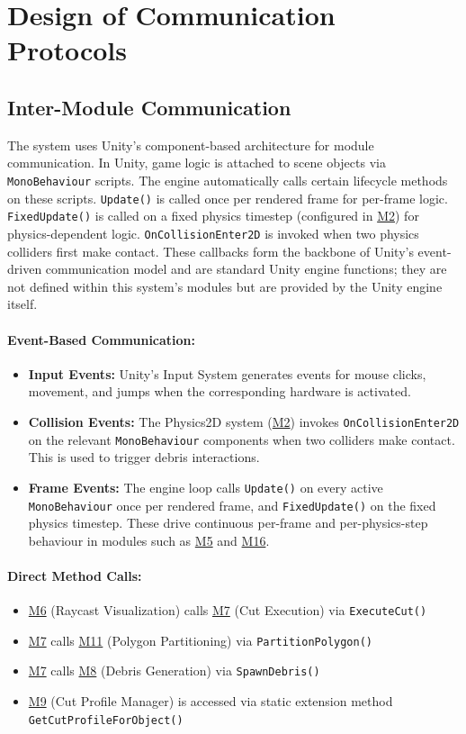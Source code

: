 \documentclass[12pt, titlepage]{article}
\begin{document}
\section{Design of Communication Protocols}\label{SecDCP}

\subsection{Inter-Module Communication}

The system uses Unity's component-based architecture for module communication.
In Unity, game logic is attached to scene objects via \texttt{MonoBehaviour} scripts.
The engine automatically calls certain lifecycle methods on these scripts.
\texttt{Update()} is called once per rendered frame for per-frame logic.
\texttt{FixedUpdate()} is called on a fixed physics timestep (configured in \hyperref[M2]{M2})
for physics-dependent logic. \texttt{OnCollisionEnter2D} is invoked when two
physics colliders first make contact. These callbacks form the backbone of Unity's
event-driven communication model and are standard Unity engine functions; they are
not defined within this system's modules but are provided by the Unity engine itself.

\paragraph{Event-Based Communication:}
\begin{itemize}
\item \textbf{Input Events:} Unity's Input System generates events for mouse clicks, movement, and jumps when the corresponding hardware is activated.
\item \textbf{Collision Events:} The Physics2D system (\hyperref[M2]{M2}) invokes \texttt{OnCollisionEnter2D} on the relevant \texttt{MonoBehaviour} components when two colliders make contact. This is used to trigger debris interactions.
\item \textbf{Frame Events:} The engine loop calls \texttt{Update()} on every active \texttt{MonoBehaviour} once per rendered frame, and \texttt{FixedUpdate()} on the fixed physics timestep. These drive continuous per-frame and per-physics-step behaviour in modules such as \hyperref[M5]{M5} and \hyperref[M16]{M16}.
\end{itemize}

\paragraph{Direct Method Calls:}
\begin{itemize}
\item \hyperref[M6]{M6} (Raycast Visualization) calls \hyperref[M7]{M7} (Cut Execution) via \texttt{ExecuteCut()}
\item \hyperref[M7]{M7} calls \hyperref[M11]{M11} (Polygon Partitioning) via \texttt{PartitionPolygon()}
\item \hyperref[M7]{M7} calls \hyperref[M8]{M8} (Debris Generation) via \texttt{SpawnDebris()}
\item \hyperref[M9]{M9} (Cut Profile Manager) is accessed via static extension method \texttt{GetCutProfileForObject()}
\end{itemize}
\end{document}
